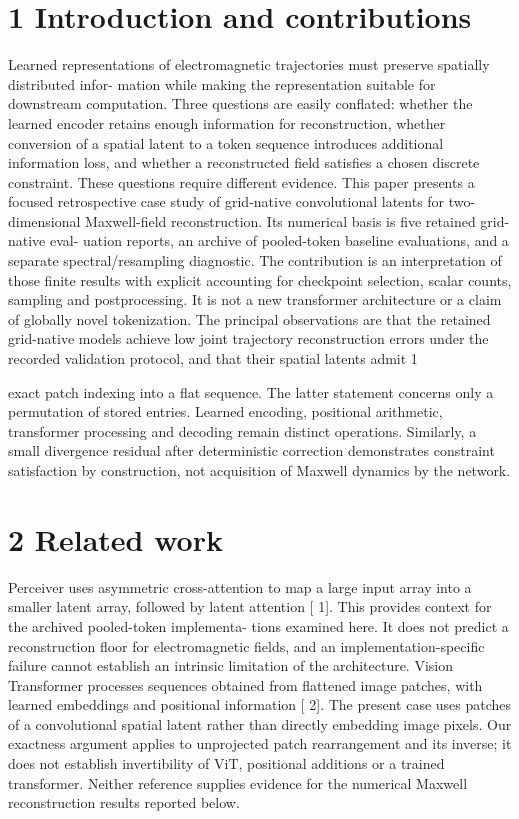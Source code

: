 \documentclass[11pt]{article}
\begin{document}
\section*{1 Introduction and contributions}

Learned representations of electromagnetic trajectories must preserve spatially distributed infor-
mation while making the representation suitable for downstream computation. Three questions
are easily conflated: whether the learned encoder retains enough information for reconstruction,
whether conversion of a spatial latent to a token sequence introduces additional information loss,
and whether a reconstructed field satisfies a chosen discrete constraint. These questions require
different evidence.
This paper presents a focused retrospective case study of grid-native convolutional latents for
two-dimensional Maxwell-field reconstruction. Its numerical basis is five retained grid-native eval-
uation reports, an archive of pooled-token baseline evaluations, and a separate spectral/resampling
diagnostic. The contribution is an interpretation of those finite results with explicit accounting
for checkpoint selection, scalar counts, sampling and postprocessing. It is not a new transformer
architecture or a claim of globally novel tokenization.
The principal observations are that the retained grid-native models achieve low joint trajectory
reconstruction errors under the recorded validation protocol, and that their spatial latents admit
1

exact patch indexing into a flat sequence. The latter statement concerns only a permutation
of stored entries. Learned encoding, positional arithmetic, transformer processing and decoding
remain distinct operations. Similarly, a small divergence residual after deterministic correction
demonstrates constraint satisfaction by construction, not acquisition of Maxwell dynamics by the
network.

\section*{2 Related work}

Perceiver uses asymmetric cross-attention to map a large input array into a smaller latent array,
followed by latent attention [ 1]. This provides context for the archived pooled-token implementa-
tions examined here. It does not predict a reconstruction floor for electromagnetic fields, and an
implementation-specific failure cannot establish an intrinsic limitation of the architecture.
Vision Transformer processes sequences obtained from flattened image patches, with learned
embeddings and positional information [ 2]. The present case uses patches of a convolutional spatial
latent rather than directly embedding image pixels. Our exactness argument applies to unprojected
patch rearrangement and its inverse; it does not establish invertibility of ViT, positional additions or
a trained transformer. Neither reference supplies evidence for the numerical Maxwell reconstruction
results reported below.
\end{document}
